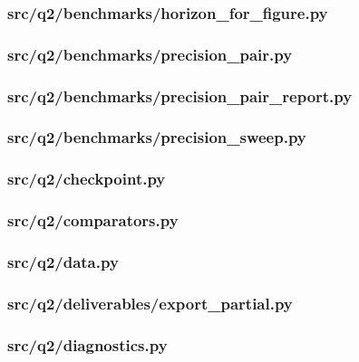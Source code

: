 \documentclass[zihao=-4,a4paper,UTF8,fontset=none]{ctexart}
\begin{document}
\subsubsection*{src/q2/benchmarks/horizon\_for\_figure.py}


\subsubsection*{src/q2/benchmarks/precision\_pair.py}


\subsubsection*{src/q2/benchmarks/precision\_pair\_report.py}


\subsubsection*{src/q2/benchmarks/precision\_sweep.py}


\subsubsection*{src/q2/checkpoint.py}


\subsubsection*{src/q2/comparators.py}


\subsubsection*{src/q2/data.py}


\subsubsection*{src/q2/deliverables/export\_partial.py}


\subsubsection*{src/q2/diagnostics.py}

\end{document}
